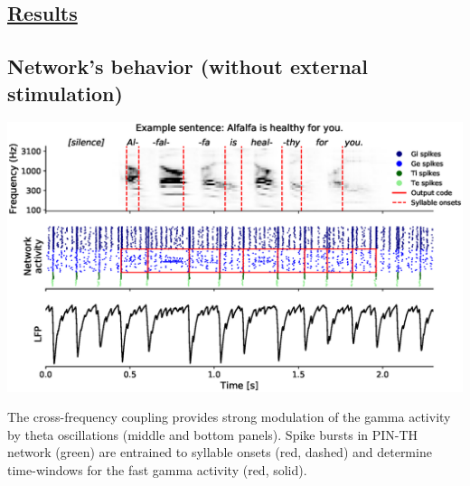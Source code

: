 \documentclass[a0,portrait]{a0poster}
\newenvironment{Figure}
  {\par\medskip\noindent\minipage{\linewidth}}
  {\endminipage\par\medskip}
\begin{document}
\begin{multicols*}{2}

\section*{\underline{Results}}
\subsection*{Network's behavior \textnormal{(without external stimulation)}}
\begin{Figure}
\centering
\includegraphics[width=\linewidth,keepaspectratio]{Behaviour_v2.eps}
\end{Figure}
\begin{flushleft}
\normalsize
The cross-frequency coupling provides strong modulation of the gamma activity by theta oscillations (middle and bottom panels). Spike bursts in PIN-TH network (green) are entrained to syllable onsets (red, dashed) and determine time-windows for the fast gamma activity (red, solid).
\end{flushleft}

\end{multicols*}
\end{document}
